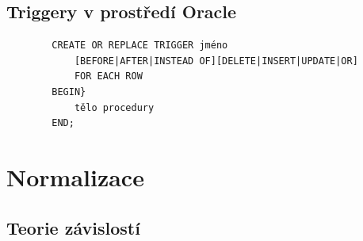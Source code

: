 \documentclass[a4paper,10pt]{article}
\begin{document}
		\subsection{Triggery v prostředí Oracle}
		\begin{verbatim}
		CREATE OR REPLACE TRIGGER jméno
		    [BEFORE|AFTER|INSTEAD OF][DELETE|INSERT|UPDATE|OR]
		    FOR EACH ROW
		BEGIN}
		    tělo procedury
		END;
		\end{verbatim}

	\section{Normalizace}
		\subsection{Teorie závislostí}
\end{document}
